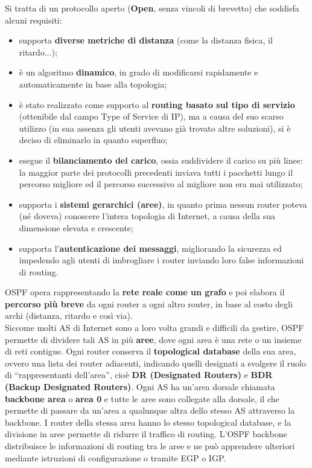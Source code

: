         Si tratta di un protocollo aperto (\textbf{Open}, senza vincoli di brevetto) che soddisfa alcuni requisiti:
        
        \begin{itemize}
            \item supporta \textbf{diverse metriche di distanza} (come la distanza fisica, il ritardo...);
            \item è un algoritmo \textbf{dinamico}, in grado di modificarsi rapidamente e automaticamente in
            base alla topologia;
            \item è stato realizzato come supporto al \textbf{routing basato sul tipo di servizio} (ottenibile dal
            campo Type of Service di IP), ma a causa del suo scarso utilizzo (in sua assenza gli utenti
            avevano già trovato altre soluzioni), si è deciso di eliminarlo in quanto superfluo;
            \item esegue il \textbf{bilanciamento del carico}, ossia suddividere il carico su più linee: la maggior
            parte dei protocolli precedenti inviava tutti i pacchetti lungo il percorso migliore ed il
            percorso successivo al migliore non era mai utilizzato;
            \item supporta i \textbf{sistemi gerarchici (aree)}, in quanto prima nessun router poteva (né
            doveva) conoscere l’intera topologia di Internet, a causa della sua dimensione elevata e
            crescente;
            \item supporta l’\textbf{autenticazione dei messaggi}, migliorando la sicurezza ed impedendo agli
            utenti di imbrogliare i router inviando loro false informazioni di routing.
        \end{itemize}

        OSPF opera rappresentando la \textbf{rete reale come un grafo} e poi elabora il \textbf{percorso più breve}
        da ogni router a ogni altro router, in base al costo degli archi (distanza, ritardo e così via).\\
        
        Siccome molti AS di Internet sono a loro volta grandi e difficili da gestire, OSPF permette di
        dividere tali AS in più \textbf{aree}, dove ogni area è una rete o un insieme di reti contigue. Ogni router
        conserva il \textbf{topological database} della sua area, ovvero una lista dei router adiacenti,
        indicando quelli designati a svolgere il ruolo di “rappresentanti dell’area”, cioè \textbf{DR (Designated
        Routers)} e \textbf{BDR (Backup Designated Routers)}. Ogni AS ha un’area dorsale chiamata
        \textbf{backbone area} o \textbf{area 0} e tutte le aree sono collegate alla dorsale, il che permette di passare
        da un’area a qualunque altra dello stesso AS attraverso la backbone.
        I router della stessa area hanno lo stesso topological database, e la divisione in aree permette
        di ridurre il traffico di routing. L’OSPF backbone distribuisce le informazioni di routing tra le
        aree e ne può apprendere ulteriori mediante istruzioni di configurazione o tramite EGP o IGP.\\

